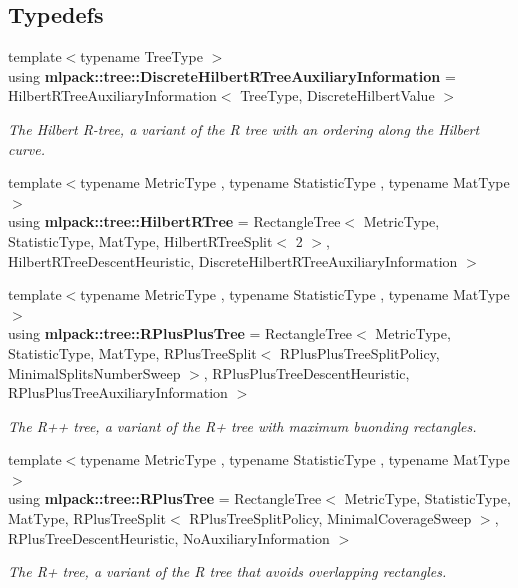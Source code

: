 \subsection*{Typedefs}
\begin{DoxyCompactItemize}
\item 
{\footnotesize template$<$typename Tree\+Type $>$ }\\using {\bf mlpack\+::tree\+::\+Discrete\+Hilbert\+R\+Tree\+Auxiliary\+Information} = Hilbert\+R\+Tree\+Auxiliary\+Information$<$ Tree\+Type, Discrete\+Hilbert\+Value $>$
\begin{DoxyCompactList}\small\item\em The Hilbert R-\/tree, a variant of the R tree with an ordering along the Hilbert curve. \end{DoxyCompactList}\item 
{\footnotesize template$<$typename Metric\+Type , typename Statistic\+Type , typename Mat\+Type $>$ }\\using {\bf mlpack\+::tree\+::\+Hilbert\+R\+Tree} = Rectangle\+Tree$<$ Metric\+Type, Statistic\+Type, Mat\+Type, Hilbert\+R\+Tree\+Split$<$ 2 $>$, Hilbert\+R\+Tree\+Descent\+Heuristic, Discrete\+Hilbert\+R\+Tree\+Auxiliary\+Information $>$
\item 
{\footnotesize template$<$typename Metric\+Type , typename Statistic\+Type , typename Mat\+Type $>$ }\\using {\bf mlpack\+::tree\+::\+R\+Plus\+Plus\+Tree} = Rectangle\+Tree$<$ Metric\+Type, Statistic\+Type, Mat\+Type, R\+Plus\+Tree\+Split$<$ R\+Plus\+Plus\+Tree\+Split\+Policy, Minimal\+Splits\+Number\+Sweep $>$, R\+Plus\+Plus\+Tree\+Descent\+Heuristic, R\+Plus\+Plus\+Tree\+Auxiliary\+Information $>$
\begin{DoxyCompactList}\small\item\em The R++ tree, a variant of the R+ tree with maximum buonding rectangles. \end{DoxyCompactList}\item 
{\footnotesize template$<$typename Metric\+Type , typename Statistic\+Type , typename Mat\+Type $>$ }\\using {\bf mlpack\+::tree\+::\+R\+Plus\+Tree} = Rectangle\+Tree$<$ Metric\+Type, Statistic\+Type, Mat\+Type, R\+Plus\+Tree\+Split$<$ R\+Plus\+Tree\+Split\+Policy, Minimal\+Coverage\+Sweep $>$, R\+Plus\+Tree\+Descent\+Heuristic, No\+Auxiliary\+Information $>$
\begin{DoxyCompactList}\small\item\em The R+ tree, a variant of the R tree that avoids overlapping rectangles. \end{DoxyCompactList}\item 

\end{DoxyCompactItemize}
